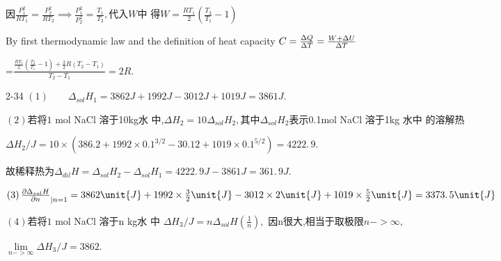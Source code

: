 \documentclass{ctexart}
\begin{document}
因\qquad $\frac{P_{1}^{2}}{RT_{1}}=\frac{P_{2}^{2}}{RT_{2}}\implies 
\frac{P_{1}^{2}}{P_{2}^{2}}=\frac{T_{1}}{T_{2}},$代入$W$中%
得\qquad $W=\frac{RT_{1}}{2}\left( \frac{T_{2}}{T_{1}}-1\right) $

By first thermodynamic law and the definition of heat capacity $C=\frac{%
\Delta Q}{\Delta T}=\frac{W+\Delta U}{\Delta T}$

=$\frac{\frac{RT_{1}}{2}\left( \frac{T_{2}}{T_{1}}-1\right) +\frac{3}{2}%
R\left( T_{2}-T_{1}\right) }{T_{2}-T_{1}}=\allowbreak 2R.$

2-34 $\left( 1\right) \qquad \Delta _{sol}H_{1}=3862\unit{J}+1992\unit{J}%
-3012\unit{J}+1019\unit{J}=\allowbreak 3861\unit{J}.$

$\left( 2\right) $若将$1$ mol NaCl 溶于10kg水%
中,$\Delta H_{2}=10\Delta _{sol}H_{2},$其中$\Delta
_{sol}H_{2}$表示0.1mol NaCl 溶于1kg 水中%
的溶解热

$\Delta H_{2}/\unit{J}=10\times \left( 386.2+1992\times
0.1^{3/2}-30.12+1019\times 0.1^{5/2}\right) =\allowbreak 4222.\,\allowbreak
9.$

故稀释热为\qquad $\Delta _{dil}H=\Delta
_{sol}H_{2}-\Delta _{sol}H_{1}=\allowbreak \allowbreak 4222.\,\allowbreak 9%
\unit{J}-\allowbreak 3861\unit{J}=\allowbreak 361.\,\allowbreak 9\unit{J}.$

$\left( 3\right) \frac{\partial \Delta _{sol}H}{\partial n}_{|n=1}=3862\unit{%
J}+1992\times \frac{3}{2}\unit{J}-3012\times 2\unit{J}+1019\times \frac{5}{2}%
\unit{J}=\allowbreak 3373.\,\allowbreak 5\unit{J}$

$\left( 4\right) $若将$1$ mol NaCl 溶于n kg水%
中 $\Delta H_{3}/\unit{J}=n\Delta _{sol}H\left( \frac{1}{n}\right) ,$%
因n很大,相当于取极限$%
n->\infty ,$

$\underset{n->\infty }{\lim }\Delta H_{3}/\unit{J}=3862.$
\end{document}
